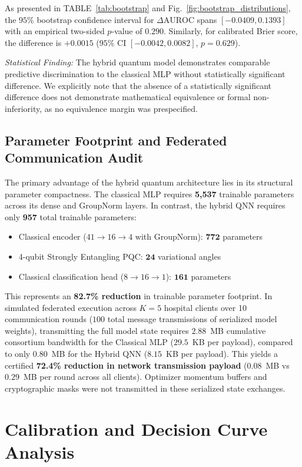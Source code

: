 \documentclass[conference]{IEEEtran}
\begin{document}
As presented in TABLE~\ref{tab:bootstrap} and Fig.~\ref{fig:bootstrap_distributions}, the $95\%$ bootstrap confidence interval for $\Delta\text{AUROC}$ spans $[-0.0409, 0.1393]$ with an empirical two-sided $p$-value of $0.290$. Similarly, for calibrated Brier score, the difference is $+0.0015$ ($95\%$ CI $[-0.0042, 0.0082]$, $p = 0.629$). 

\textit{Statistical Finding:} The hybrid quantum model demonstrates comparable predictive discrimination to the classical MLP without statistically significant difference. We explicitly note that the absence of a statistically significant difference does not demonstrate mathematical equivalence or formal non-inferiority, as no equivalence margin was prespecified.

\subsection{Parameter Footprint and Federated Communication Audit}
The primary advantage of the hybrid quantum architecture lies in its structural parameter compactness. The classical MLP requires \textbf{5,537} trainable parameters across its dense and GroupNorm layers. In contrast, the hybrid QNN requires only \textbf{957} total trainable parameters:
\begin{itemize}
    \item Classical encoder ($41 \to 16 \to 4$ with GroupNorm): $\mathbf{772}$ parameters
    \item 4-qubit Strongly Entangling PQC: $\mathbf{24}$ variational angles
    \item Classical classification head ($8 \to 16 \to 1$): $\mathbf{161}$ parameters
\end{itemize}

This represents an \textbf{82.7\% reduction} in trainable parameter footprint. In simulated federated execution across $K=5$ hospital clients over 10 communication rounds ($100$ total message transmissions of serialized model weights), transmitting the full model state requires $2.88$~MB cumulative consortium bandwidth for the Classical MLP ($29.5$~KB per payload), compared to only $0.80$~MB for the Hybrid QNN ($8.15$~KB per payload). This yields a certified \textbf{72.4\% reduction in network transmission payload} ($0.08$~MB vs $0.29$~MB per round across all clients). Optimizer momentum buffers and cryptographic masks were not transmitted in these serialized state exchanges.

\section{Calibration and Decision Curve Analysis}
\end{document}
